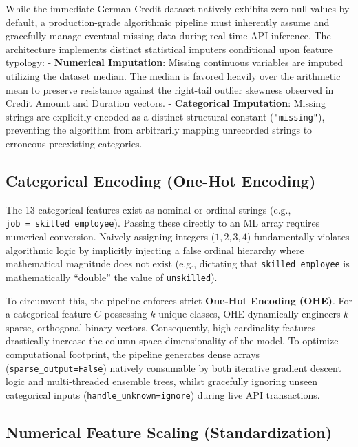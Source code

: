While the immediate German Credit dataset natively exhibits zero null
values by default, a production-grade algorithmic pipeline must
inherently assume and gracefully manage eventual missing data during
real-time API inference. The architecture implements distinct
statistical imputers conditional upon feature typology: -
\textbf{Numerical Imputation}: Missing continuous variables are imputed
utilizing the dataset median. The median is favored heavily over the
arithmetic mean to preserve resistance against the right-tail outlier
skewness observed in Credit Amount and Duration vectors. -
\textbf{Categorical Imputation}: Missing strings are explicitly encoded
as a distinct structural constant (\texttt{"missing"}), preventing the
algorithm from arbitrarily mapping unrecorded strings to erroneous
preexisting categories.

\hypertarget{categorical-encoding-one-hot-encoding}{%
\subsection{Categorical Encoding (One-Hot
Encoding)}\label{categorical-encoding-one-hot-encoding}}

The 13 categorical features exist as nominal or ordinal strings (e.g.,
\texttt{job\ =\ skilled\ employee}). Passing these directly to an ML
array requires numerical conversion. Naively assigning integers
(\(1, 2, 3, 4\)) fundamentally violates algorithmic logic by implicitly
injecting a false ordinal hierarchy where mathematical magnitude does
not exist (e.g., dictating that \texttt{skilled\ employee} is
mathematically ``double'' the value of \texttt{unskilled}).

To circumvent this, the pipeline enforces strict \textbf{One-Hot
Encoding (OHE)}. For a categorical feature \(C\) possessing \(k\) unique
classes, OHE dynamically engineers \(k\) sparse, orthogonal binary
vectors. Consequently, high cardinality features drastically increase
the column-space dimensionality of the model. To optimize computational
footprint, the pipeline generates dense arrays
(\texttt{sparse\_output=False}) natively consumable by both iterative
gradient descent logic and multi-threaded ensemble trees, whilst
gracefully ignoring unseen categorical inputs
(\texttt{handle\_unknown=\textquotesingle{}ignore\textquotesingle{}})
during live API transactions.

\hypertarget{numerical-feature-scaling-standardization}{%
\subsection{Numerical Feature Scaling
(Standardization)}\label{numerical-feature-scaling-standardization}}

